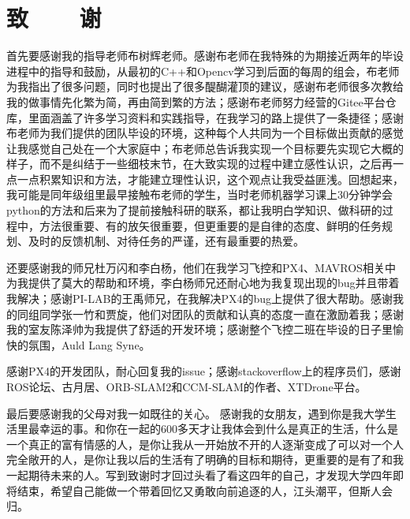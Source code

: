 

\renewcommand{\baselinestretch}{1.5}
\fontsize{12pt}{13pt}\selectfont

\chapter*{致~~~~谢}

首先要感谢我的指导老师布树辉老师。感谢布老师在我特殊的为期接近两年的毕设进程中的指导和鼓励，从最初的C++和Opencv学习到后面的每周的组会，布老师为我指出了很多问题，同时也提出了很多醍醐灌顶的建议，感谢布老师很多次教给我的做事情先化繁为简，再由简到繁的方法；感谢布老师努力经营的Gitee平台仓库，里面涵盖了许多学习资料和实践指导，在我学习的路上提供了一条捷径；感谢布老师为我们提供的团队毕设的环境，这种每个人共同为一个目标做出贡献的感觉让我感觉自己处在一个大家庭中；布老师总告诉我实现一个目标要先实现它大概的样子，而不是纠结于一些细枝末节，在大致实现的过程中建立感性认识，之后再一点一点积累知识和方法，才能建立理性认识，这个观点让我受益匪浅。回想起来，我可能是同年级组里最早接触布老师的学生，当时老师机器学习课上30分钟学会python的方法和后来为了提前接触科研的联系，都让我明白学知识、做科研的过程中，方法很重要、有的放矢很重要，但更重要的是自律的态度、鲜明的任务规划、及时的反馈机制、对待任务的严谨，还有最重要的热爱。

还要感谢我的师兄杜万闪和李白杨，他们在我学习飞控和PX4、MAVROS相关中为我提供了莫大的帮助和环境，李白杨师兄还耐心地为我复现出现的bug并且带着我解决；感谢PI-LAB的王禹师兄，在我解决PX4的bug上提供了很大帮助。感谢我的同组同学张一竹和贾旋，他们对团队的贡献和认真的态度一直在激励着我；感谢我的室友陈泽帅为我提供了舒适的开发环境；感谢整个飞控二班在毕设的日子里愉快的氛围，Auld Lang Syne。

感谢PX4的开发团队，耐心回复我的issue；感谢stackoverflow上的程序员们，感谢ROS论坛、古月居、ORB-SLAM2和CCM-SLAM的作者、XTDrone平台。

最后要感谢我的父母对我一如既往的关心。
感谢我的女朋友，遇到你是我大学生活里最幸运的事。和你在一起的600多天才让我体会到什么是真正的生活，什么是一个真正的富有情感的人，是你让我从一开始放不开的人逐渐变成了可以对一个人完全敞开的人，是你让我以后的生活有了明确的目标和期待，更重要的是有了和我一起期待未来的人。写到致谢时才回过头看了看这四年的自己，才发现大学四年即将结束，希望自己能做一个带着回忆又勇敢向前追逐的人，江头潮平，但斯人会归。
